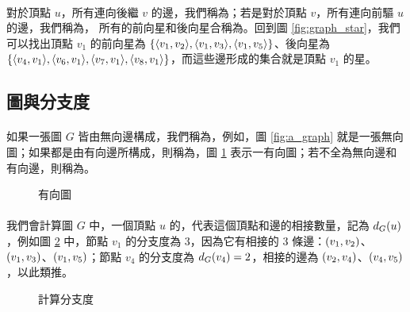 \documentclass[12pt,a4paper,oneside]{report}
\begin{document}
\begin{CJK}{UTF8}{bkai}
\paragraph{}對於頂點 $u$，所有連向後繼 $v$ 的邊，我們稱為\textbf{}；若是對於頂點 $v$，所有連向前驅 $u$ 的邊，我們稱為， 所有的前向星和後向星合稱為。回到圖 \ref{fig:graph_star}，我們可以找出頂點 $v_1$ 的前向星為 $\{\langle{}{{v_1},{v_2}}\rangle{},\langle{}{{v_1},{v_3}}\rangle{},\langle{}{{v_1},{v_5}}\rangle{}\}$、後向星為 $\{{\langle{}{{v_4},{v_1}}\rangle{},\langle{}{{v_6},{v_1}}\rangle{},\langle{}{{v_7},{v_1}}\rangle{},\langle{}{{v_8},{v_1}}\rangle{}}\}$，而這些邊形成的集合就是頂點 $v_1$ 的星。

\subsection{圖與分支度}
\paragraph{}如果一張圖 $G$ 皆由無向邊構成，我們稱為\textbf{}，例如，圖 \ref{fig:a_graph} 就是一張無向圖；如果都是由有向邊所構成，則稱為\textbf{}，圖 \ref{fig:directed_graph} 表示一有向圖；若不全為無向邊和有向邊，則稱為。
\begin{figure}[h!]
\centering
{}
\caption{有向圖}
\label{fig:directed_graph}
\end{figure}

\paragraph{}我們會計算圖 $G$ 中，一個頂點 $u$ 的\textbf{}，代表這個頂點和邊的相接數量，記為 $d_{G}{(u)}$，例如圖 \ref{fig:degree_cal} 中，節點 $v_1$ 的分支度為 3，因為它有相接的 3 條邊：$({v_1},{v_2})$、$({v_1},{v_3})$、$({v_1},{v_5})$；節點 $v_4$ 的分支度為 $d_{G}{(v_4)}=2$，相接的邊為 $({v_2},{v_4})$、$({v_4},{v_5})$，以此類推。
\begin{figure}[h!]
\centering
{}
\caption{計算分支度}
\label{fig:degree_cal}
\end{figure}


\end{CJK}
\end{document}
